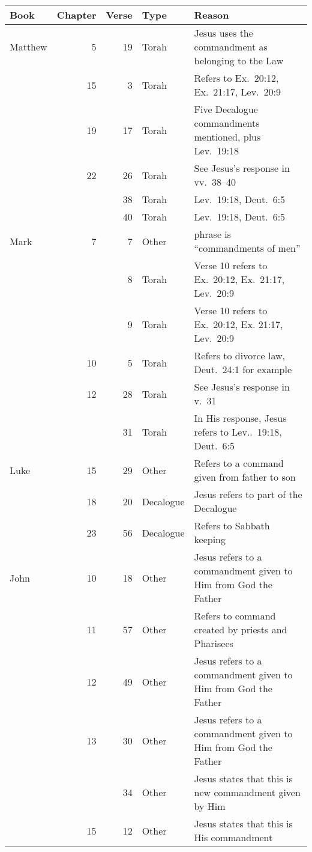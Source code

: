 \documentclass{article}
\begin{document}
\begin{table}
    \centering
    \footnotesize
    \renewcommand\arraystretch{1}
    \begin{tabularx}{\textwidth+40pt}{@{}lrrlX@{}}
    \toprule
    Book & Chapter & Verse & Type & Reason \\
    \midrule
    Matthew & 5&19 & Torah & Jesus uses the commandment as belonging to the Law \\
    &15&3 & Torah & Refers to Ex.\ 20:12, Ex.\ 21:17, Lev.\ 20:9 \\
    &19&17 & Torah & Five Decalogue commandments mentioned, plus Lev.\ 19:18 \\
    &22&26 & Torah & See Jesus's response in vv.\ 38--40\\
    & &38 & Torah & Lev.\ 19:18, Deut.\ 6:5\\
    & &40 & Torah & Lev.\ 19:18, Deut.\ 6:5\\
    Mark&7&7 & Other & phrase is ``commandments of men'' \\
    & &8 & Torah & Verse 10 refers to Ex.\ 20:12, Ex.\ 21:17, Lev.\ 20:9\\
    & &9 & Torah & Verse 10 refers to Ex.\ 20:12, Ex. 21:17, Lev.\ 20:9\\
    &10&5 & Torah & Refers to divorce law, Deut.\ 24:1 for example\\
    &12&28 & Torah & See Jesus's response in v.\ 31 \\
    & &31 & Torah & In His response, Jesus refers to Lev..\ 19:18, Deut.\ 6:5\\
    Luke&15&29 & Other & Refers to a command given from father to son\\
    &18&20 & Decalogue & Jesus refers to part of the Decalogue\\
    &23&56 & Decalogue & Refers to Sabbath keeping\\
    John&10&18 & Other & Jesus refers to a commandment given to Him from God the Father\\
    &11&57 & Other & Refers to command created by priests and Pharisees\\
    &12&49 & Other & Jesus refers to a commandment given to Him from God the Father\\
    &13&30 & Other & Jesus refers to a commandment given to Him from God the Father\\
    & &34 & Other & Jesus states that this is new commandment given by Him\\
    &15&12 & Other & Jesus states that this is His commandment\\

\end{tabularx}
\end{table}
\end{document}
